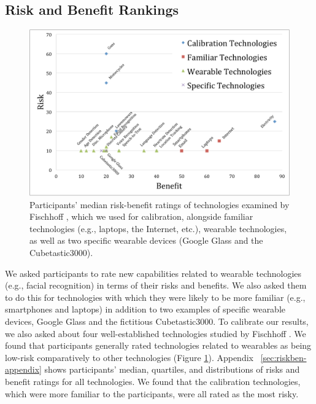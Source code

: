 
\subsection{Risk and Benefit Rankings} 
\begin{figure}[t]
	\centering
	\includegraphics[width=\columnwidth]{images/riskbenefit.pdf}
	\caption{Participants' median risk-benefit ratings of technologies examined by Fischhoff \etal\cite{Fischhoff}, which we used for calibration, alongside familiar technologies (e.g., laptops, the Internet, etc.), wearable technologies, as well as two specific wearable devices (Google Glass and the Cubetastic3000).}
	\label{fig:techplot}
\end{figure}

We asked participants to rate new capabilities related to wearable technologies (e.g., facial recognition) in terms of their risks and benefits. We also asked them to do this for technologies with which they were likely to be more familiar (e.g., smartphones and laptops) in addition to two examples of specific wearable devices, Google Glass and the fictitious Cubetastic3000. To calibrate our results, we also asked about four well-established technologies studied by Fischhoff \etal\cite{Fischhoff}. We found that participants generally rated technologies related to wearables as being low-risk comparatively to other technologies (Figure \ref{fig:techplot}). Appendix ~\ref{sec:riskben-appendix} shows participants' median, quartiles, and distributions of risks and benefit ratings for all technologies. We found that the calibration technologies, which were more familiar to the participants, were all rated as the most risky. 

